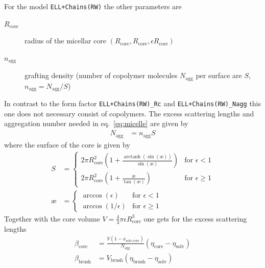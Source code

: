\vspace{10mm}

\noindent
For the model \texttt{ELL+Chains(RW)} the other parameters are
\begin{description}
\item[$R_\text{core}$] radius of the micellar core $(R_\text{core},R_\text{core},\epsilon R_\text{core})$
\item[$n_\text{agg}$] grafting density (number of copolymer molecules
$N_\text{agg}$ per surface are $S$, $n_\text{agg}=N_\text{agg}/S$)
\end{description}

\noindent
In contrast to the form factor \texttt{ELL+Chains(RW)\_Rc} and \texttt{ELL+Chains(RW)\_Nagg}
this one does not necessary consist of copolymers.
The excess scattering lengths and aggregation number needed in eq.\
\ref{eq:micelle} are given by \sloppy
\begin{align}
N_\text{agg} &= n_\text{agg} S
\end{align}
where the surface of the core is given by
\begin{align}
S  &=
\begin{cases}
 2\pi R_\text{core}^2 \left(1+\frac{\operatorname{arctanh}(\sin(\text{\ae}))}{\sin(\text{\ae})}\right)& \text{for~} \epsilon < 1 \\
 2\pi R_\text{core}^2 \left(1+\frac{\text{\ae}}{\tan(\text{\ae})}\right) & \text{for~} \epsilon \geq 1
\end{cases} \\
\text{\ae} &=
\begin{cases}
 \arccos(\epsilon) & \text{for~} \epsilon < 1 \\
 \arccos(1/\epsilon) & \text{for~} \epsilon \geq 1
\end{cases} \nonumber
\end{align}
Together with the core volume
$V =\frac{4}{3}\pi \epsilon R_\text{core}^3$ one gets for the excess scattering
lengths
\begin{align}
\beta_\text{core} &= \frac{V (1-x_\text{solv,core})}{N_\text{agg}}
(\eta_\text{core}-\eta_\text{solv}) \\
\beta_\text{brush} &= V_\text{brush} (\eta_\text{brush}-\eta_\text{solv})
\end{align}

\vspace{3mm}

